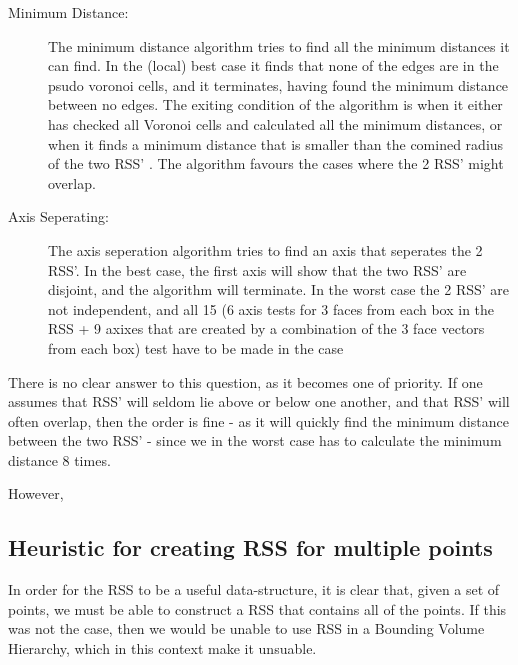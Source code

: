 \begin{description}
\item[Minimum Distance:] The minimum distance algorithm tries to find all the minimum distances it can find. In the (local) best case it finds that none of the edges are in the psudo voronoi cells, and it terminates, having found the minimum distance between no edges. The exiting condition of the algorithm is when it either has checked all Voronoi cells  and calculated all the minimum distances, or when it finds a minimum distance that is smaller than the comined radius of the two RSS' . The algorithm favours the cases where the 2 RSS' might overlap.  

\item[Axis Seperating:] The axis seperation algorithm tries to find an axis that seperates the 2 RSS'. In the best case, the first axis will show that the two RSS' are disjoint, and the algorithm will terminate. In the worst case the 2 RSS' are not independent, and all 15 (6 axis tests for 3 faces from each box in the RSS  + 9 axixes that are created by a combination of the 3 face vectors from each box) test have to be made in the case 
\end{description}

There is no clear answer to this question, as it becomes one of priority. If one assumes that RSS' will seldom lie above or below one another, and that RSS' will often overlap, then the order is fine - as it will quickly find the minimum distance between the two RSS' - since we in the worst case has to calculate the minimum distance 8 times.

However,    


\subsection{Heuristic for creating RSS for multiple points}
In order for the RSS to be a useful data-structure, it is clear that, given a set of points, we must be able to construct a RSS that contains all of the points. If this was not the case, then we would be unable to use RSS in a Bounding Volume Hierarchy, which in this context make it unsuable. 

